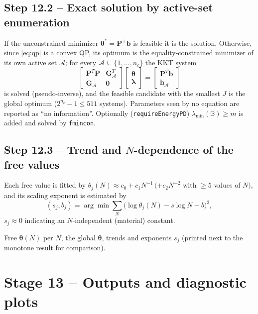 \documentclass[11pt,a4paper]{article}
\newcommand{\B}{\mathbb{B}}                     %
\newcommand{\bP}{\bm{P}}
\newcommand{\bb}{\bm{b}}
\newcommand{\bth}{\bm{\theta}}
\newcommand{\code}[1]{\texttt{#1}}
\theoremstyle{plain}
\theoremstyle{remark}
\begin{document}
\subsection*{Step 12.2 -- Exact solution by active-set enumeration}
If the unconstrained minimizer $\bth^\ast=\bP^+\bb$ is feasible it is the solution. Otherwise,
since \eqref{eq:qp} is a convex QP, its optimum is the equality-constrained minimizer of its own
active set $\mathcal A$; for every $\mathcal A\subseteq\{1,\dots,n_c\}$ the KKT system
\begin{equation}
  \begin{bmatrix}\bP^T\bP&\bm G_{\mathcal A}^T\\\bm G_{\mathcal A}&\bm0\end{bmatrix}
  \begin{bmatrix}\bth\\\bm\lambda\end{bmatrix}=
  \begin{bmatrix}\bP^T\bb\\\bm h_{\mathcal A}\end{bmatrix}
\end{equation}
is solved (pseudo-inverse), and the feasible candidate with the smallest $J$ is the global optimum
($2^{n_c}-1\le511$ systems). Parameters seen by no equation are reported as ``no information''.
Optionally (\code{requireEnergyPD}) $\lambda_{\min}(\B)\ge m$ is added and solved by \code{fmincon}.

\subsection*{Step 12.3 -- Trend and $N$-dependence of the free values}
Each free value is fitted by $\theta_j(N)\approx c_0+c_1N^{-1}\,(+c_2N^{-2}$ with $\ge5$ values
of $N)$, and its scaling exponent is estimated by
\begin{equation}
  (s_j,b_j)=\arg\min\sum_N\big(\log\theta_j(N)-s\log N-b\big)^2,
\end{equation}
$s_j\approx0$ indicating an $N$-independent (material) constant.
\begin{delivers}
Free $\bth(N)$ per $N$, the global $\bth$, trends and exponents $s_j$ (printed next to the monotone
result for comparison).
\end{delivers}

\section{Stage 13 -- Outputs and diagnostic plots}
\label{sec:stage13}
\end{document}
